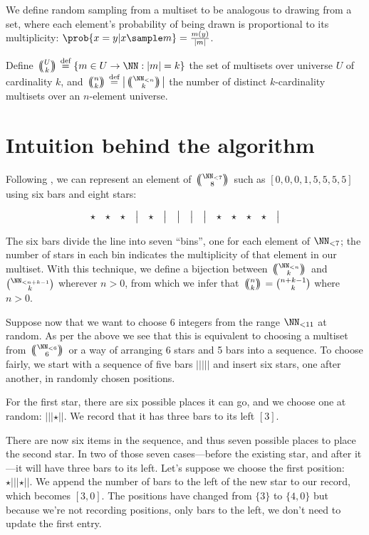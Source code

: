 \documentclass[letterpaper,luatex,11pt]{article}
\newcommand{\multichoose}[2]{
\left.\mathchoice
  {\left(\kern-0.48em\binom{#1}{#2}\kern-0.48em\right)}
  {\big(\kern-0.30em\binom{\smash{#1}}{\smash{#2}}\kern-0.30em\big)}
  {\left(\kern-0.30em\binom{\smash{#1}}{\smash{#2}}\kern-0.30em\right)}
  {\left(\kern-0.30em\binom{\smash{#1}}{\smash{#2}}\kern-0.30em\right)}
\right.}
\newcommand*{\defeq}{\stackrel{\text{def}}{=}}
\begin{document}
We define random sampling from a multiset to be analogous to drawing from a set,
where each element's probability of being drawn is proportional to its multiplicity:
$\prob{x = y |x \sample m} = \frac{m(y)}{|m|}$.

Define $\multichoose{U}{k} \defeq \{m \in U \rightarrow \NN: |m| = k\}$ the set of multisets over
universe \(U\) of cardinality \(k\), and \(\multichoose{n}{k} \defeq \left|\multichoose{\NN_{<n}}{k}\right|\)
the number of distinct \(k\)-cardinality multisets over an \(n\)-element universe.

\section{Intuition behind the algorithm}

Following \cite{feller}, we can represent an element of \(\multichoose{\NN_{<7}}{8}\)
such as \([0,0,0,1,5,5,5,5]\) using six bars and eight stars:

\begin{displaymath}
    \begin{array}{ c c c c c c c c c c c c c c c }
        \star & \star & \star & \big| & \star & \big| & \big| & \big| & \big| & \star & \star & \star & \star & \big| \\
    \end{array}
\end{displaymath}

The six bars divide the line into seven ``bins'', one for each element of \(\NN_{<7}\); the
number of stars in each bin indicates the multiplicity of that element in our multiset.
With this technique, we define a bijection between \(\multichoose{\NN_{<n}}{k}\) and
\(\binom{\NN_{<n + k - 1}}{k}\) wherever \(n > 0\), from which we infer that
\(\multichoose{n}{k} = \binom{n + k - 1}{k}\) where \(n > 0\).

Suppose now that we want to choose 6 integers from the range $\NN_{<11}$ 
at random. As per the above we see that this 
is equivalent to choosing a multiset from \(\multichoose{\NN_{<6}}{6}\)
or a way of arranging 6 stars and 5 bars into a sequence.
To choose fairly, we start with a sequence of five bars \(|||||\) and insert six stars,
one after another, in randomly chosen positions.

For the first star, there are six possible places it can go, and we choose one at random:
\(|||\star||\). We record that it has three bars to its left \([3]\).

There are now six items in the sequence, and thus seven possible places to place the second star.
In two of those seven cases---before the existing star, and after it---it will have three bars
to its left. Let's suppose we choose the first position: \(\star|||\star||\). We append
the number of bars to the left of the new star to our record, which becomes \([3, 0]\).
The positions have changed from \(\{3\}\)
to \(\{4, 0\}\) but because we're not recording positions, only bars to the left, we don't need to
update the first entry.
\end{document}
